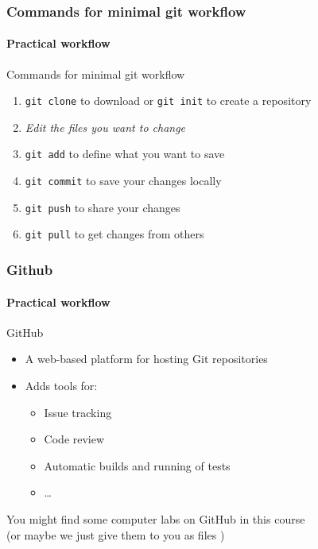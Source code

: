 \documentclass[aspectratio=169,dvipsnames]{beamer}
\begin{document}
\begin{frame}
    \frametitle{Commands for minimal git workflow}
    \framesubtitle{Practical workflow}
    \begin{block}{Commands for minimal git workflow}
        \begin{enumerate}
            \item \texttt{git clone} to download or \texttt{git init} to create a repository
            \item \textit{Edit the files you want to change}
            \item \texttt{git add} to define what you want to save
            \item \texttt{git commit} to save your changes locally
            \item \texttt{git push} to share your changes
            \item \texttt{git pull} to get changes from others
        \end{enumerate}
    \end{block}
\end{frame}

\begin{frame}
    \frametitle{Github}
    \framesubtitle{Practical workflow}
        \begin{block}{GitHub}
        \begin{itemize}
            \item A web-based platform for hosting Git repositories
            \item Adds tools for:
            \begin{itemize}
                \item Issue tracking
                \item Code review
                \item Automatic builds and running of tests
                \item \ldots
            \end{itemize}
        \end{itemize}
        \end{block}

        \begin{center}
            You might find some computer labs on GitHub in this course \\ (or maybe we just give them to you as files \smiley)
        \end{center}
\end{frame}
\end{document}
